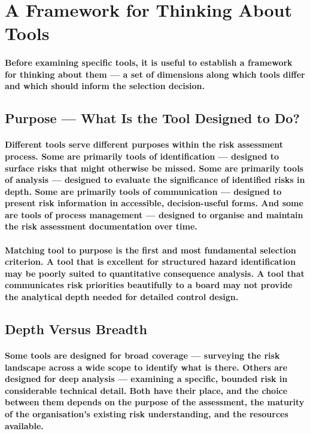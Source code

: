 \section{A Framework for Thinking About Tools}
\paragraph{Before examining specific tools, it is useful to establish a framework for thinking about them — a set of dimensions along which tools differ and which should inform the selection decision.}

\subsection{Purpose — What Is the Tool Designed to Do?}
\paragraph{Different tools serve different purposes within the risk assessment process. Some are primarily tools of \textbf{identification} — designed to surface risks that might otherwise be missed. Some are primarily tools of analysis — designed to evaluate the significance of identified risks in depth. Some are primarily tools of \textbf{communication} — designed to present risk information in accessible, decision-useful forms. And some are tools of \textbf{process management} — designed to organise and maintain the risk assessment documentation over time.}
\paragraph{Matching tool to purpose is the first and most fundamental selection criterion. A tool that is excellent for structured hazard identification may be poorly suited to quantitative consequence analysis. A tool that communicates risk priorities beautifully to a board may not provide the analytical depth needed for detailed control design.}

\subsection{Depth Versus Breadth}
\paragraph{Some tools are designed for \textbf{broad} coverage — surveying the risk landscape across a wide scope to identify what is there. Others are designed for \textbf{deep analysis} — examining a specific, bounded risk in considerable technical detail. Both have their place, and the choice between them depends on the purpose of the assessment, the maturity of the organisation's existing risk understanding, and the resources available.}
